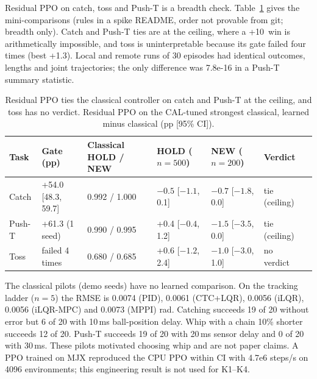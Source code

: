 Residual PPO on catch, toss and Push-T is a breadth check. Table~\ref{tab:16a} gives the mini-comparisons (rules in a spike README, order not provable from git; breadth only). Catch and Push-T ties are at the ceiling, where a +10\pp\ win is arithmetically impossible, and toss is uninterpretable because its gate failed four times (best +1.3\pp). Local and remote runs of 30 episodes had identical outcomes, lengths and joint trajectories; the only difference was 7.8e-16 in a Push-T summary statistic.

\begin{table}[htbp]
\centering
\caption{Residual PPO ties the classical controller on catch and Push-T at the ceiling, and toss has no verdict. Residual PPO on the CAL-tuned strongest classical, learned minus classical (pp [95\% CI]).}
\label{tab:16a}
\begin{tabular}{@{}lllllll@{}}
\toprule
Task & Gate (pp) & Classical HOLD / NEW & HOLD ($n{=}500$) & NEW ($n{=}200$) & Verdict \\ \midrule
Catch & +54.0 [48.3, 59.7] & 0.992 / 1.000 & $-0.5$ [$-1.1$, 0.1] & $-0.7$ [$-1.8$, 0.0] & tie (ceiling) \\
Push-T & +61.3 (1 seed) & 0.990 / 0.995 & +0.4 [$-0.4$, 1.2] & $-1.5$ [$-3.5$, 0.0] & tie (ceiling) \\
Toss & failed 4 times & 0.680 / 0.685 & +0.6 [$-1.2$, 2.4] & $-1.0$ [$-3.0$, 1.0] & no verdict \\
\bottomrule
\end{tabular}
\end{table}

The classical pilots (demo seeds) have no learned comparison. On the tracking ladder ($n{=}5$) the RMSE is 0.0074 (PID), 0.0061 (CTC+LQR), 0.0056 (iLQR), 0.0056 (iLQR-MPC) and 0.0073 (MPPI) rad. Catching succeeds 19 of 20 without error but 6 of 20 with 10\,ms ball-position delay. Whip with a chain 10\% shorter succeeds 12 of 20. Push-T succeeds 19 of 20 with 20\,ms sensor delay and 0 of 20 with 30\,ms. These pilots motivated choosing whip and are not paper claims. A PPO trained on MJX reproduced the CPU PPO within CI with 4.7e6 steps/s on 4096 environments; this engineering result is not used for K1--K4.
